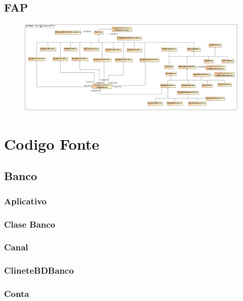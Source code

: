 \documentclass[a4paper,titlepage]{article}
\begin{document}
\clearpage

\subsection{FAP}
\begin{figure}[h!]
  \begin{center}
    \includegraphics[width=0.9\textheight,angle=90]{MagicDraw/DiagramaFAP.jpg}
  \end{center}
\end{figure}

\clearpage
\newpage

\section {Codigo Fonte}
\subsection{Banco}
\subsubsection{Aplicativo}

\subsubsection{Clase Banco}

\subsubsection{Canal}

\subsubsection{ClineteBDBanco}

\subsubsection{Conta}

\end{document}
